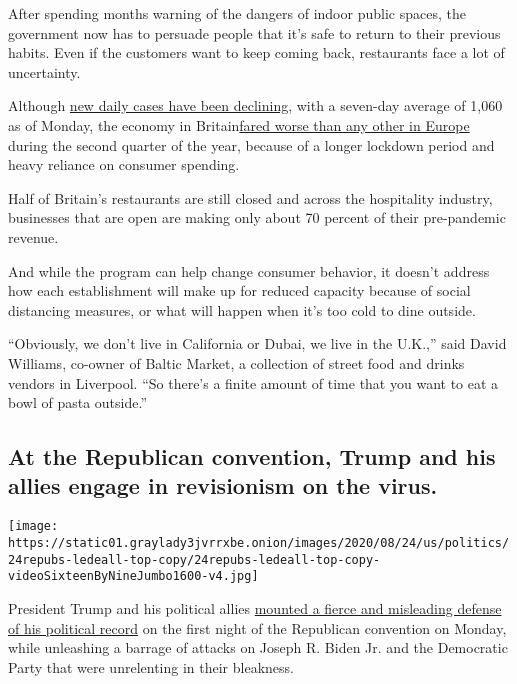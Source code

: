 After spending months warning of the dangers of indoor public spaces,
the government now has to persuade people that it's safe to return to
their previous habits. Even if the customers want to keep coming back,
restaurants face a lot of uncertainty.

Although
\href{https://www.nytimes3xbfgragh.onion/interactive/2020/world/europe/united-kingdom-coronavirus-cases.html}{new
daily cases have been declining}, with a seven-day average of 1,060 as
of Monday, the economy in
Britain\href{https://www.nytimes3xbfgragh.onion/2020/08/12/business/britain-economy-recession-coronavirus.html?action=click\&module=RelatedLinks\&pgtype=Article}{fared
worse than any other in Europe} during the second quarter of the year,
because of a longer lockdown period and heavy reliance on consumer
spending.

Half of Britain's restaurants are still closed and across the
hospitality industry, businesses that are open are making only about 70
percent of their pre-pandemic revenue.

And while the program can help change consumer behavior, it doesn't
address how each establishment will make up for reduced capacity because
of social distancing measures, or what will happen when it's too cold to
dine outside.

``Obviously, we don't live in California or Dubai, we live in the
U.K.,'' said David Williams, co-owner of Baltic Market, a collection of
street food and drinks vendors in Liverpool. ``So there's a finite
amount of time that you want to eat a bowl of pasta outside.''

\hypertarget{at-the-republican-convention-trump-and-his-allies-engage-in-revisionism-on-the-virus}{%
\subsection{At the Republican convention, Trump and his allies engage in
revisionism on the
virus.}\label{at-the-republican-convention-trump-and-his-allies-engage-in-revisionism-on-the-virus}}

\texttt{[image: https://static01.graylady3jvrrxbe.onion/images/2020/08/24/us/politics/24repubs-ledeall-top-copy/24repubs-ledeall-top-copy-videoSixteenByNineJumbo1600-v4.jpg]}

President Trump and his political allies
\href{https://www.nytimes3xbfgragh.onion/2020/08/24/us/politics/republican-convention-recap.html}{mounted
a fierce and misleading defense of his political record} on the first
night of the Republican convention on Monday, while unleashing a barrage
of attacks on Joseph R. Biden Jr. and the Democratic Party that were
unrelenting in their bleakness.

